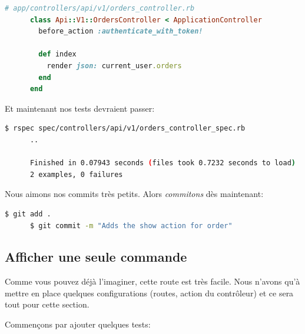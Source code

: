 \documentclass[]{report}
\begin{document}
    \begin{scriptsize}
      \begin{lstlisting}[language=ruby]
      # app/controllers/api/v1/orders_controller.rb
      class Api::V1::OrdersController < ApplicationController
        before_action :authenticate_with_token!

        def index
          render json: current_user.orders
        end
      end
      \end{lstlisting}
    \end{scriptsize}

    Et maintenant nos tests devraient passer:

    \begin{scriptsize}
      \begin{lstlisting}[language=bash]
      $ rspec spec/controllers/api/v1/orders_controller_spec.rb
      ..

      Finished in 0.07943 seconds (files took 0.7232 seconds to load)
      2 examples, 0 failures
      \end{lstlisting}
    \end{scriptsize}

    Nous aimons nos commits très petits. Alors \textit{commitons} dès maintenant:

    \begin{scriptsize}
      \begin{lstlisting}[language=bash]
      $ git add .
      $ git commit -m "Adds the show action for order"
      \end{lstlisting}
    \end{scriptsize}

    \subsection{Afficher une seule commande}

      Comme vous pouvez déjà l'imaginer, cette route est très facile. Nous n'avons qu'à mettre en place quelques configurations (routes, action du contrôleur) et ce sera tout pour cette section.

      Commençons par ajouter quelques tests:
\end{document}
